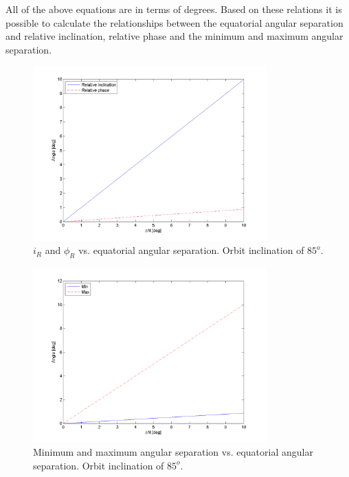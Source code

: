 All of the above equations are in terms of degrees. Based on these relations it is possible to calculate the relationships between the equatorial angular separation and relative inclination, relative phase and the minimum and maximum angular separation.

\begin{figure}[ht!]
\centering
\includegraphics[width=0.8\textwidth, angle=0]{chapters/img/relativeInc.png}

\caption{$i_R$ and $\phi_R$ vs. equatorial angular separation. Orbit inclination of $85^o$.}
\label{fig:relativeI}
\end{figure}

\begin{figure}[ht!]
\centering
\includegraphics[width=0.8\textwidth, angle=0]{chapters/img/angularSeperation.png}

\caption{Minimum and maximum angular separation vs. equatorial angular separation. Orbit inclination of $85^o$.}
\label{fig:relativeSep}
\end{figure}

